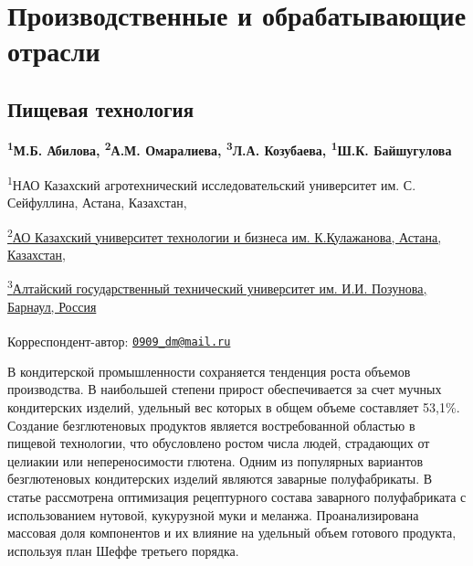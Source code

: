 \newpage
\let\cleardoublepage\clearpage
\part{Производственные и обрабатывающие отрасли}
\chapter{Пищевая технология}

\begin{articleheader}

{\bfseries \textsuperscript{1}М.Б. Абилова\textsuperscript{\envelope },
\textsuperscript{2}А.М. Омаралиева, \textsuperscript{3}Л.А. Козубаева,
\textsuperscript{1}Ш.К. Байшугулова}
\end{articleheader}

\begin{affiliation}
\textsuperscript{1}НАО Казахский агротехнический исследовательский
университет им. С. Сейфуллина, Астана,
Казахстан,\href{https://bankchart.kz/spravochniki/pochtovyye_indeksy/id/116470}{}

\href{https://bankchart.kz/spravochniki/pochtovyye_indeksy/id/116470}{\textsuperscript{2}АО
Казахский университет технологии и бизнеса им. К.Кулажанова, Астана,
Казахстан,}

\href{https://bankchart.kz/spravochniki/pochtovyye_indeksy/id/116470}{\textsuperscript{3}Алтайский
государственный технический университет им. И.И. Позунова, Барнаул,
Россия}

\raggedright \textsuperscript{\envelope }Корреспондент-автор: \href{mailto:0909_dm@mail.ru}{\nolinkurl{0909\_dm@mail.ru}}
\end{affiliation}

В кондитерской промышленности сохраняется тенденция роста объемов
производства. В наибольшей степени прирост обеспечивается за счет мучных
кондитерских изделий, удельный вес которых в общем объеме составляет
53,1\%. Создание безглютеновых продуктов является востребованной
областью в пищевой технологии, что обусловлено ростом числа людей,
страдающих от целиакии или непереносимости глютена. Одним из популярных
вариантов безглютеновых кондитерских изделий являются заварные
полуфабрикаты. В статье рассмотрена оптимизация рецептурного состава
заварного полуфабриката с использованием нутовой, кукурузной муки и
меланжа. Проанализирована массовая доля компонентов и их влияние на
удельный объем готового продукта, используя план Шеффе третьего порядка.

